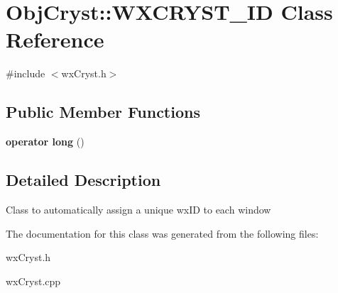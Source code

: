 \hypertarget{class_obj_cryst_1_1_w_x_c_r_y_s_t___i_d}{}\section{Obj\+Cryst\+::W\+X\+C\+R\+Y\+S\+T\+\_\+\+ID Class Reference}
\label{class_obj_cryst_1_1_w_x_c_r_y_s_t___i_d}


{\ttfamily \#include $<$wx\+Cryst.\+h$>$}

\subsection*{Public Member Functions}
\begin{DoxyCompactItemize}
\item 
\mbox{\label{class_obj_cryst_1_1_w_x_c_r_y_s_t___i_d_ad556605a5923122932a3425ca70dea59}} 
{\bfseries operator long} ()
\end{DoxyCompactItemize}


\subsection{Detailed Description}
Class to automatically assign a unique wx\+ID to each window 

The documentation for this class was generated from the following files\+:\begin{DoxyCompactItemize}
\item 
wx\+Cryst.\+h\item 
wx\+Cryst.\+cpp\end{DoxyCompactItemize}
